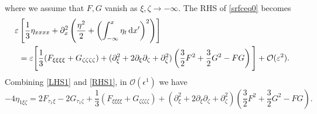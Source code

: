 where we assume that $F,G$ vanish as $\xi, \zeta \to -\infty.$
The RHS of \eqref{srfceq0} becomes
\begin{align}
\varepsilon &\left[ \frac{1}{3}\eta_{xxxx} +  \partial_x^2 \left( \frac{\eta^2}{2} + \left( \int^{x}_{-\infty} \eta_t \,\mathrm{d} x' \right)^2\right)\right] \nonumber\\
&= \varepsilon \Bigg[ \frac{1}{3}(F_{\xi\xi\xi\xi} + G_{\zeta\zeta\zeta\zeta}) +  (\partial_\xi^2 + 2\partial_\xi \partial_\zeta + \partial_\zeta^2) \left(\frac{3}{2} F^2  + \frac{3}{2}G^2 - FG \right) \Bigg] + \mathcal{O}(\varepsilon^2). \label{RHS1}
\end{align}
Combining \eqref{LHS1} and \eqref{RHS1}, in $\mathcal{O}(\epsilon^1)$ we have
\begin{equation}\label{srfceq2}
- 4\eta_{1\xi \zeta} = 2F_{\tau_1 \xi} - 2G_{\tau_1 \zeta} + \frac{1}{3}(F_{\xi\xi\xi\xi} + G_{\zeta\zeta\zeta\zeta}) + (\partial_\xi^2 + 2\partial_\xi \partial_\zeta + \partial_\zeta^2) \left(\frac{3}{2} F^2  + \frac{3}{2}G^2 - FG \right).
\end{equation}
